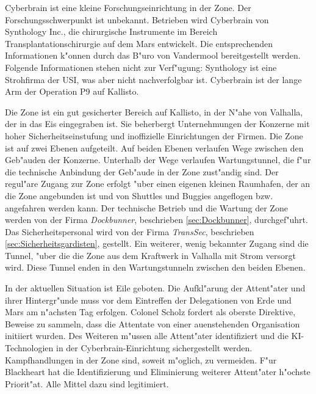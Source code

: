 
Cyberbrain ist eine kleine Forschungseinrichtung in der Zone. Der Forschungsschwerpunkt ist unbekannt. Betrieben wird Cyberbrain von Synthology Inc., die chirurgische Instrumente im Bereich Transplantationschirurgie auf dem Mars entwickelt. Die entsprechenden Informationen k"onnen durch das B"uro von Vandermool bereitgestellt werden. Folgende Informationen stehen nicht zur Verf"ugung: Synthology ist eine Strohfirma der USI, was aber nicht nachverfolgbar ist. Cyberbrain ist der lange Arm der Operation P9 auf Kallisto.

Die Zone ist ein gut gesicherter Bereich auf Kallisto, in der N"ahe von Valhalla, der in das Eis eingegraben ist. Sie beherbergt Unternehmungen der Konzerne mit hoher Sicherheitseinstufung und inoffizielle Einrichtungen der Firmen. Die Zone ist auf zwei Ebenen aufgeteilt. Auf beiden Ebenen verlaufen Wege zwischen den Geb"auden der Konzerne. Unterhalb der Wege verlaufen Wartungstunnel, die f"ur die technische Anbindung der Geb"aude in der Zone zust"andig sind. Der regul"are Zugang zur Zone erfolgt "uber einen eigenen kleinen Raumhafen, der an die Zone angebunden ist und von Shuttles und Buggies angeflogen bzw. angefahren werden kann. Der technische Betrieb und die Wartung der Zone werden von der Firma \emph{Dockbunner}, beschrieben \cref{sec:Dockbunner}, durchgef"uhrt. Das Sicherheitspersonal wird von der Firma \emph{TransSec}, beschrieben \cref{sec:Sicherheitsgardisten}, gestellt. Ein weiterer, wenig bekannter Zugang sind die Tunnel, "uber die die Zone aus dem Kraftwerk in Valhalla mit Strom versorgt wird. Diese Tunnel enden in den Wartungstunneln zwischen den beiden Ebenen.

In der aktuellen Situation ist Eile geboten. Die Aufkl"arung der Attent"ater und ihrer Hintergr"unde muss vor dem Eintreffen der Delegationen von Erde und Mars am n"achsten Tag erfolgen. Colonel Scholz fordert als oberste Direktive, Beweise zu sammeln, dass die Attentate von einer au\3enstehenden Organisation initiiert wurden. Des Weiteren m"ussen alle Attent"ater identifiziert und die KI-Technologien in der Cyberbrain-Einrichtung sichergestellt werden. Kampfhandlungen in der Zone sind, soweit m"oglich, zu vermeiden. F"ur Blackheart hat die Identifizierung und Eliminierung weiterer Attent"ater h"ochste Priorit"at. Alle Mittel dazu sind legitimiert.

